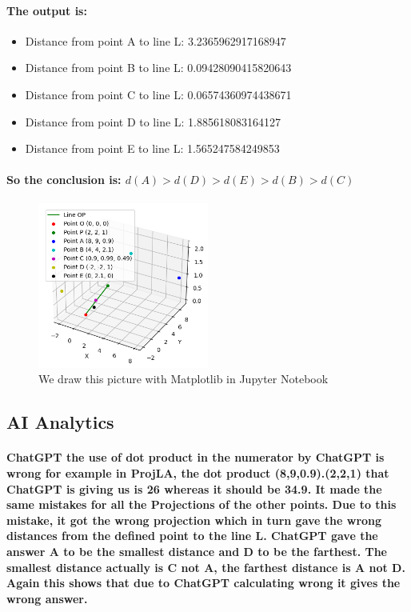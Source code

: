 \documentclass[11pt]{article} %
\begin{document}
\paragraph{The output is: }
\begin{itemize}
    \item Distance from point A to line L: 3.2365962917168947
    \item Distance from point B to line L: 0.09428090415820643
    \item Distance from point C to line L: 0.06574360974438671
    \item Distance from point D to line L: 1.885618083164127
    \item Distance from point E to line L: 1.565247584249853
\end{itemize}

\paragraph{\textbf{So the conclusion is: $d(A)>d(D)>d(E)>d(B)>d(C)$}}


% 
\begin{figure}[H]
    \centering
    \includegraphics[width=0.5\textwidth]{pic/DrawPlot.png}
    \caption{We draw this picture with Matplotlib in Jupyter Notebook}
\end{figure}
% 
% 
% 
\subsection{AI Analytics}
\paragraph{\textbf{ChatGPT} the use of dot product in the numerator by ChatGPT is wrong for example in
    ProjLA, the dot product (8,9,0.9).(2,2,1) that ChatGPT is giving us is 26 whereas it should
    be 34.9. It made the same mistakes for all the Projections of the other points. Due to this
    mistake, it got the wrong projection which in turn gave the wrong distances from the defined
    point to the line L. ChatGPT gave the answer A to be the smallest distance and D to be
    the farthest. The smallest distance actually is C not A, the farthest distance is A not D.
    Again this shows that due to ChatGPT calculating wrong it gives the wrong answer.}
\end{document}
